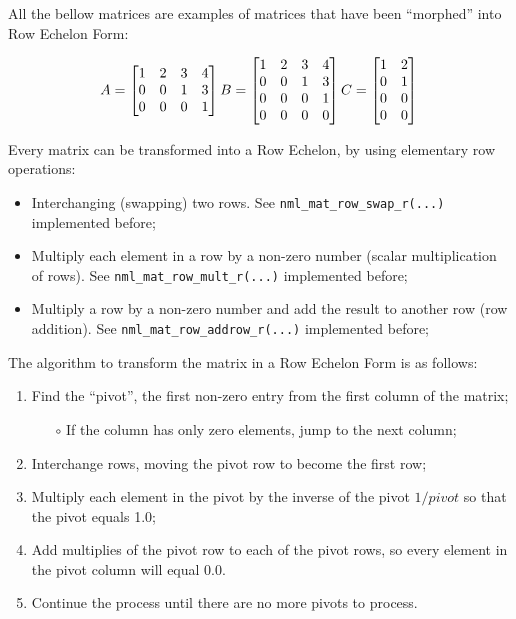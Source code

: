 All the bellow matrices are examples of matrices that have been ``morphed'' into Row Echelon Form:

$$
A=
\begin{bmatrix}
1 & 2 & 3 & 4 \\
0 & 0 & 1 & 3 \\
0 & 0 & 0 & 1 
\end{bmatrix}
\\
B=
\begin{bmatrix}
1 & 2 & 3 & 4 \\
0 & 0 & 1 & 3 \\
0 & 0 & 0 & 1 \\
0 & 0 & 0 & 0
\end{bmatrix}
\\
C=
\begin{bmatrix}
1 & 2 \\
0 & 1 \\
0 & 0 \\
0 & 0
\end{bmatrix}
\\
$$

Every matrix can be transformed into a Row Echelon, by using elementary row operations:

\begin{itemize}
\item Interchanging (swapping) two rows. See {\tt nml\_mat\_row\_swap\_r(...)} implemented before;
\item Multiply each element in a row by a non-zero number (scalar multiplication of rows). See {\tt nml\_mat\_row\_mult\_r(...)} implemented before;
\item Multiply a row by a non-zero number and add the result to another row (row addition). See {\tt nml\_mat\_row\_addrow\_r(...)} implemented before;
\end{itemize}

The algorithm to transform the matrix in a Row Echelon Form is as follows:

\begin{enumerate}
\item Find the “pivot”, the first non-zero entry from the first column of the matrix;
	\begin{itemize}
	\item[$\circ$] If the column has only zero elements, jump to the next column;
	\end{itemize}
\item Interchange rows, moving the pivot row to become the first row;
\item Multiply each element in the pivot by the inverse of the pivot $1/{pivot}$
so that the pivot equals 1.0;
\item Add multiplies of the pivot row to each of the pivot rows, so every element in the pivot column will equal 0.0.
\item Continue the process until there are no more pivots to process.
\end{enumerate}

